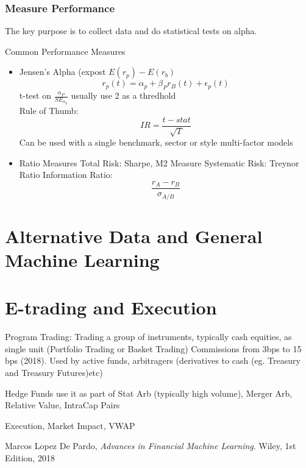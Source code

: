 \documentclass[11pt, openany]{book}              %
\begin{document}
  
\subsection{Measure Performance}

The key purpose is to collect data and do statistical tests on alpha. 

Common Performance Measures

\begin{itemize}
 \item Jensen's Alpha (expost $E(r_p) - E(r_b)$
 $$ r_p(t) = \alpha_p + \beta_P r_B(t) + \epsilon_p(t) $$
 t-test on $\frac{\alpha_P}{SE_{\alpha_p}}$ usually use 2 as a thredhold \\
 Rule of Thumb:
 $$IR = \frac{t-stat}{\sqrt{T}}$$
 Can be used with a single benchmark, sector or style multi-factor models
 \item Ratio Measures
	\subitem Total Risk: Sharpe, M2 Measure
	\subitem Systematic Risk: Treynor Ratio
	\subitem Information Ratio: $$ \frac{r_A - r_B}{\sigma_{A/B}}$$
\end{itemize}
  


\chapter{Alternative Data and General Machine Learning}

\chapter{E-trading and Execution}

Program Trading: Trading a group of instruments, typically cash equities, as single unit (Portfolio Trading or Basket Trading) Commissions from 3bps to 15 bps (2018). Used by active funds, arbitragers (derivatives to cash (eg. Treasury and Treasury Futures)etc)

Hedge Funds use it as part of Stat Arb (typically high volume), Merger Arb, Relative Value, IntraCap Pairs


Execution, Market Impact, VWAP 


\begin{thebibliography}{999}

  Marcos Lopez De Pardo, 
  \emph{Advances in Financial Machine Learning}.
  Wiley,
  1st Edition,
  2018

\end{thebibliography}
 
\end{document}
